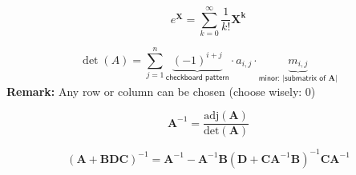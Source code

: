 \newpar{}
\begin{equation*}
    e^{\mathbf{X}} = \sum_{k=0}^{\infty}\frac{1}{k!}\mathbf{X^k}
\end{equation*}

\newpar{}
\noindent\begin{equation*}
    \det(A)=\sum_{j=1}^n \underbrace{{(-1)}^{i+j}}_{\textsf{checkboard pattern}}\cdot a_{i,j}\cdot\underbrace{m_{i,j}}_{\textsf{minor: |submatrix of }\mathbf{A}|}
\end{equation*}
\textbf{Remark:} Any row or column can be chosen (choose wisely: 0)

\newpar{}
\begin{equation*}
    \mathbf{A}^{-1}  = \frac{\text{adj}(\mathbf{A})}{\text{det}(\mathbf{A})}
\end{equation*}

\newpar{}
\label{app:MIL}
\begin{equation*}
    {(\mathbf{A} + \mathbf{BDC})}^{-1} = \mathbf{A}^{-1} - \mathbf{A}^{-1}\mathbf{B}{\left(\mathbf{D} + \mathbf{C}\mathbf{A}^{-1}\mathbf{B}\right)}^{-1}\mathbf{C}\mathbf{A}^{-1}
\end{equation*}